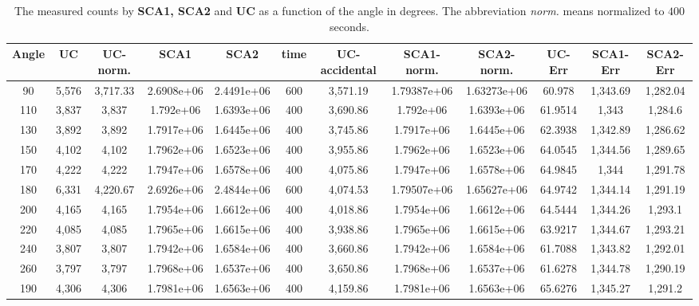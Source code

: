 \documentclass{article}
\begin{document}
\begin{landscape}
\begin{table}
\centering 
\begin{tabular}{|*{12}{c|}}
\hline 
Angle & UC & UC-norm. & SCA1 & SCA2 & time & UC-accidental & SCA1-norm. & SCA2-norm. & UC-Err & SCA1-Err & SCA2-Err\\ \hline 
90 & 5,576 & 3,717.33 & 2.6908e+06 & 2.4491e+06 & 600 & 3,571.19 & 1.79387e+06 & 1.63273e+06 & 60.978 & 1,343.69 & 1,282.04 \\ \hline 
 110 & 3,837 & 3,837 & 1.792e+06 & 1.6393e+06 & 400 & 3,690.86 & 1.792e+06 & 1.6393e+06 & 61.9514 & 1,343 & 1,284.6 \\ \hline 
 130 & 3,892 & 3,892 & 1.7917e+06 & 1.6445e+06 & 400 & 3,745.86 & 1.7917e+06 & 1.6445e+06 & 62.3938 & 1,342.89 & 1,286.62 \\ \hline 
 150 & 4,102 & 4,102 & 1.7962e+06 & 1.6523e+06 & 400 & 3,955.86 & 1.7962e+06 & 1.6523e+06 & 64.0545 & 1,344.56 & 1,289.65 \\ \hline 
 170 & 4,222 & 4,222 & 1.7947e+06 & 1.6578e+06 & 400 & 4,075.86 & 1.7947e+06 & 1.6578e+06 & 64.9845 & 1,344 & 1,291.78 \\ \hline 
 180 & 6,331 & 4,220.67 & 2.6926e+06 & 2.4844e+06 & 600 & 4,074.53 & 1.79507e+06 & 1.65627e+06 & 64.9742 & 1,344.14 & 1,291.19 \\ \hline 
 200 & 4,165 & 4,165 & 1.7954e+06 & 1.6612e+06 & 400 & 4,018.86 & 1.7954e+06 & 1.6612e+06 & 64.5444 & 1,344.26 & 1,293.1 \\ \hline 
 220 & 4,085 & 4,085 & 1.7965e+06 & 1.6615e+06 & 400 & 3,938.86 & 1.7965e+06 & 1.6615e+06 & 63.9217 & 1,344.67 & 1,293.21 \\ \hline 
 240 & 3,807 & 3,807 & 1.7942e+06 & 1.6584e+06 & 400 & 3,660.86 & 1.7942e+06 & 1.6584e+06 & 61.7088 & 1,343.82 & 1,292.01 \\ \hline 
 260 & 3,797 & 3,797 & 1.7968e+06 & 1.6537e+06 & 400 & 3,650.86 & 1.7968e+06 & 1.6537e+06 & 61.6278 & 1,344.78 & 1,290.19 \\ \hline 
 190 & 4,306 & 4,306 & 1.7981e+06 & 1.6563e+06 & 400 & 4,159.86 & 1.7981e+06 & 1.6563e+06 & 65.6276 & 1,345.27 & 1,291.2 \\ \hline 
 \end{tabular}
 \caption{The measured counts by \textbf{SCA1, SCA2} and \textbf{UC} as a function of the angle in degrees. The abbreviation \textit{norm.} means normalized to $400$ seconds.}
\end{table} 
\end{landscape}
\end{document}
